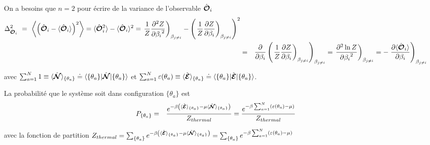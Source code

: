 On a besoins que $n=2$ pour écrire de la variance de l'observable $\hat{\bm{\mathcal{O}}}_i$ 
\begin{eqnarray}
	\Delta_{\hat{\bm{\mathcal{O}}}_i}^2 ~=~  	\left \langle \left (\hat{\bm{\mathcal{O}}}_i - \langle\hat{\bm{\mathcal{O}}}_i \rangle \right )^2  \right \rangle  = 	\langle\hat{\bm{\mathcal{O}}}_i^2 \rangle  -  \langle\hat{\bm{\mathcal{O}}}_i \rangle^2 = \left . \frac{1}{Z} \frac{ \partial^2 Z }{ {\partial \beta_i}^2 }  \right )_{\beta_{j\neq i}} - \left ( \left . \frac{1}{Z}\frac{ \partial Z }{ \partial \beta_i }  \right )_{\beta_{j\neq i}}\right )^2  \\
		& = & \frac{\partial}{\partial \beta_i } \left ( \left . \frac{1}{Z} \frac{\partial Z}{\partial \beta_i }  \right )_{\beta_{j\neq i}}  \right )_{\beta_{j\neq i}} =  \left . \frac{\partial^2 \ln Z  }{{\partial \beta_i}^2 }  \right )_{\beta_{j\neq i}}  = - \left . 	\frac{\partial \langle\hat{\bm{\mathcal{O}}}_i \rangle }{\partial \beta_i } \right )_{\beta_{j\neq i}}		
\end{eqnarray}





 



	
	avec $\sum_{a = 1}^N 1 \equiv \langle \hat{\bm{\mathcal{N}}} \rangle_{ \{\theta_a \} }  \doteq  \langle \{ \theta_a \}\vert  \hat{\bm{\mathcal{N}}} \vert\{ \theta_a\}\rangle  $ et $  \sum_{a = 1}^N  \varepsilon ( \theta_a ) \equiv \langle \hat{\bm{\mathcal{E}}} \rangle_{\{\theta_a \}}  \doteq  \langle \{ \theta_a \}\vert  \hat{\bm{ \mathcal{E}}}  \vert\{ \theta_a\}\rangle $.

	
	La probabilité que le système soit dans configuration $\{ \theta_a \}$  est 
	\begin{eqnarray}
		P_{\{\theta_a \}} & = & \frac{e^{- \beta \left ( \langle \hat{\bm{\mathcal{E}}} \rangle_{\{\theta_a \}}   - \mu \langle \hat{\bm{\mathcal{N}}} \rangle_{\{\theta_a \}} \right )}}{Z_{thermal}} = \frac{e^{- \beta \sum_{a=1}^N  ( \varepsilon( \theta_a )   - \mu  )}}{Z_{thermal}}	
	\end{eqnarray}
	
	avec la fonction de partition $Z_{thermal} = \sum_{\{ \theta_a\}}e^{- \beta \left ( \langle \hat{\bm{\mathcal{E}}} \rangle_{\{\theta_a \}}   - \mu \langle \hat{\bm{\mathcal{N}}} \rangle_{\{\theta_a \}} \right )} = \sum_{\{ \theta_a\}} e^{- \beta \sum_{a=1}^N  ( \varepsilon( \theta_a )   - \mu  )}$
	
